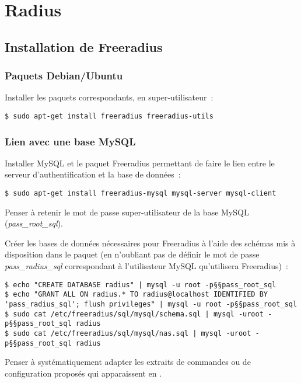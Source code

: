 \section{Radius}
\subsection{Installation de Freeradius}
\subsubsection{Paquets Debian/Ubuntu}

Installer les paquets correspondants, en super-utilisateur~:

\begin{lstlisting}
$ sudo apt-get install freeradius freeradius-utils
\end{lstlisting}

\subsubsection{Lien avec une base MySQL}

Installer MySQL et le paquet Freeradius permettant de faire le lien entre le serveur d'authentification et la base de données~:

\begin{lstlisting}
$ sudo apt-get install freeradius-mysql mysql-server mysql-client
\end{lstlisting}

Penser à retenir le mot de passe super-utilisateur de la base MySQL (\emph{pass\_root\_sql}).

Créer les bases de données nécessaires pour Freeradius à l'aide des schémas mis à disposition dans le paquet (en n'oubliant pas de définir le mot de passe \emph{pass\_radius\_sql} correspondant à l'utilisateur MySQL qu'utilisera Freeradius)~:

\begin{lstlisting}
$ echo "CREATE DATABASE radius" | mysql -u root -p§§pass_root_sql
$ echo "GRANT ALL ON radius.* TO radius@localhost IDENTIFIED BY 'pass_radius_sql'; flush privileges" | mysql -u root -p§§pass_root_sql
$ sudo cat /etc/freeradius/sql/mysql/schema.sql | mysql -uroot -p§§pass_root_sql radius
$ sudo cat /etc/freeradius/sql/mysql/nas.sql | mysql -uroot -p§§pass_root_sql radius
\end{lstlisting}

{\Large\Info} Penser à systématiquement adapter les extraits de commandes ou de configuration proposés qui apparaissent en {}.


